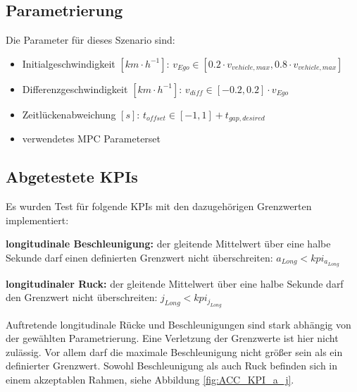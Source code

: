 \subsection{Parametrierung}
Die Parameter für dieses Szenario sind:
\begin{itemize}
    \item Initialgeschwindigkeit $[km\cdot h^{-1}]$: $v_{Ego} \in [0.2\cdot v_{vehicle,max}, 0.8\cdot v_{vehicle,max}]$
    \item Differenzgeschwindigkeit $[km\cdot h^{-1}]$: $v_{diff} \in [-0.2,0.2]\cdot v_{Ego}$
    \item Zeitlückenabweichung $[s]$: $t_{offset} \in [-1,1] + t_{gap,desired}$
    \item verwendetes MPC Parameterset
\end{itemize}

\subsection{Abgetestete KPIs}
Es wurden Test für folgende KPIs mit den dazugehörigen Grenzwerten implementiert:

\medskip\noindent\textbf{longitudinale Beschleunigung:} der gleitende Mittelwert über eine halbe Sekunde darf einen definierten Grenzwert nicht überschreiten: $a_{Long} < kpi_{a_{Long}}$

\medskip\noindent\textbf{longitudinaler Ruck:} der gleitende Mittelwert über eine halbe Sekunde darf den Grenzwert nicht überschreiten: $j_{Long} < kpi_{j_{Long}}$

\noindent Auftretende longitudinale Rücke und Beschleunigungen sind stark abhängig von der gewählten Parametrierung. Eine Verletzung der Grenzwerte ist hier nicht zulässig. Vor allem darf die maximale Beschleunigung nicht größer sein als ein definierter Grenzwert. Sowohl Beschleunigung als auch Ruck befinden sich in einem akzeptablen Rahmen, siehe Abbildung \ref{fig:ACC_KPI_a_j}.

